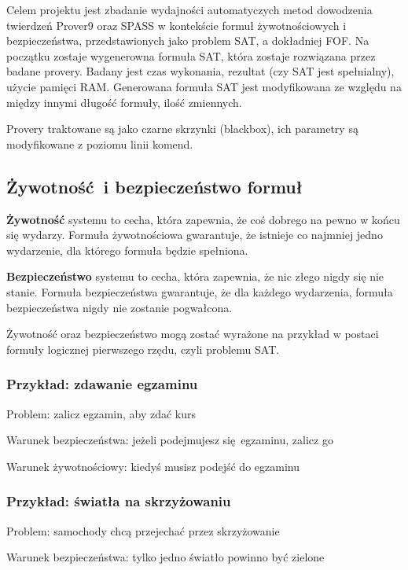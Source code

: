 \documentclass[a4paper,12pt]{article}
\begin{document}
Celem projektu jest zbadanie wydajności automatyczych metod dowodzenia twierdzeń Prover9 oraz SPASS w kontekście formuł żywotnościowych i bezpieczeństwa, przedstawionych jako problem \gls{SAT}, a dokładniej \gls{FOF}. Na początku zostaje wygenerowna formuła \gls{SAT}, która zostaje rozwiązana przez badane provery. Badany jest czas wykonania, rezultat (czy \gls{SAT} jest spełnialny), użycie pamięci RAM.  Generowana formuła \gls{SAT} jest modyfikowana ze względu na między innymi długość formuły, ilość zmiennych.

Provery traktowane są jako czarne skrzynki (blackbox), ich parametry są modyfikowane z poziomu linii komend.

\subsection{Żywotność i bezpieczeństwo formuł}

\textbf{Żywotność} systemu to cecha, która zapewnia, że coś dobrego na pewno w końcu się wydarzy. Formuła żywotnościowa gwarantuje, że istnieje co najmniej jedno wydarzenie, dla którego formuła będzie spełniona.

\textbf{Bezpieczeństwo} systemu to cecha, która zapewnia, że nic złego nigdy się nie stanie. Formuła bezpieczeństwa gwarantuje, że dla każdego wydarzenia, formuła bezpieczeństwa nigdy nie zostanie pogwałcona.

Żywotność oraz bezpieczeństwo mogą zostać wyrażone na przykład w postaci formuły logicznej pierwszego rzędu, czyli problemu SAT.

\subsubsection{Przykład: zdawanie egzaminu}

\noindent
Problem: zalicz egzamin, aby zdać kurs

\noindent
Warunek bezpieczeństwa: jeżeli podejmujesz się egzaminu, zalicz go

\noindent
Warunek żywotnościowy: kiedyś musisz podejść do egzaminu

\subsubsection{Przykład: światła na skrzyżowaniu}

\noindent
Problem: samochody chcą przejechać przez skrzyżowanie

\noindent
Warunek bezpieczeństwa: tylko jedno światło powinno być zielone
\end{document}
